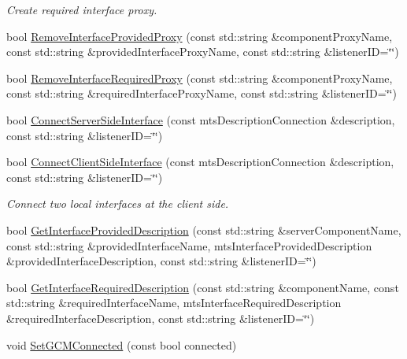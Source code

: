 \begin{DoxyCompactItemize}
\begin{DoxyCompactList}\small\item\em Create required interface proxy. \end{DoxyCompactList}\item 
bool \hyperlink{classmts_manager_local_a741ff68bfb31dcfad6a3ec244f7d2227}{Remove\+Interface\+Provided\+Proxy} (const std\+::string \&component\+Proxy\+Name, const std\+::string \&provided\+Interface\+Proxy\+Name, const std\+::string \&listener\+I\+D=\char`\"{}\char`\"{})
\item 
bool \hyperlink{classmts_manager_local_ac58e53b7cb5f77daf8cdcfb6cc0d0e1e}{Remove\+Interface\+Required\+Proxy} (const std\+::string \&component\+Proxy\+Name, const std\+::string \&required\+Interface\+Proxy\+Name, const std\+::string \&listener\+I\+D=\char`\"{}\char`\"{})
\item 
bool \hyperlink{classmts_manager_local_aad3fbe9e5b41e75e55599f8f7d61b8f0}{Connect\+Server\+Side\+Interface} (const mts\+Description\+Connection \&description, const std\+::string \&listener\+I\+D=\char`\"{}\char`\"{})
\item 
bool \hyperlink{classmts_manager_local_af8f8d230b07f5d647b0e363f7e632160}{Connect\+Client\+Side\+Interface} (const mts\+Description\+Connection \&description, const std\+::string \&listener\+I\+D=\char`\"{}\char`\"{})
\begin{DoxyCompactList}\small\item\em Connect two local interfaces at the client side. \end{DoxyCompactList}\item 
bool \hyperlink{classmts_manager_local_ae131ad1d60cfa1b0abb675905251785a}{Get\+Interface\+Provided\+Description} (const std\+::string \&server\+Component\+Name, const std\+::string \&provided\+Interface\+Name, mts\+Interface\+Provided\+Description \&provided\+Interface\+Description, const std\+::string \&listener\+I\+D=\char`\"{}\char`\"{})
\item 
bool \hyperlink{classmts_manager_local_a8056ed6c161b39b6492a671de76f71f2}{Get\+Interface\+Required\+Description} (const std\+::string \&component\+Name, const std\+::string \&required\+Interface\+Name, mts\+Interface\+Required\+Description \&required\+Interface\+Description, const std\+::string \&listener\+I\+D=\char`\"{}\char`\"{})
\item 
void \hyperlink{classmts_manager_local_af2a833e91816219c9e925e580c298182}{Set\+G\+C\+M\+Connected} (const bool connected)
\end{DoxyCompactItemize}

